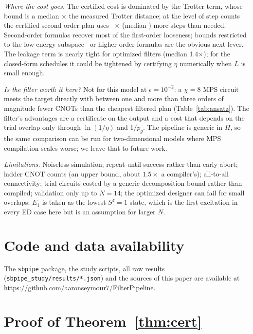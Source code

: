 \documentclass[aps,pra,twocolumn,superscriptaddress,nofootinbib]{revtex4-2}
\begin{document}
\emph{Where the cost goes.} The certified cost is dominated by the Trotter term, whose bound is a
median \trotRatioMed$\times$ the measured Trotter distance; at the level of step counts the certified
second-order plan uses \oracleMin--\oracleMax$\times$ (median \oracleMed) more steps than needed. Second-order formulas recover most of the first-order looseness;
bounds restricted to the low-energy subspace~\cite{Sahinoglu2021} or higher-order formulas are the
obvious next lever. The leakage term is nearly tight for optimized filters (median 1.4$\times$); for the closed-form
schedules it could be tightened by certifying $\eta$ numerically when $L$ is small enough.

\emph{Is the filter worth it here?} Not for this model at $\epsilon=10^{-2}$: a $\chi=8$ MPS circuit
meets the target directly with between one and more than three orders of magnitude fewer CNOTs than
the cheapest filtered plan (Table~\ref{tab:ansatz}).
The filter's advantages are a certificate on the output and a cost that depends on the trial overlap
only through $\ln(1/\eta)$ and $1/p_g$. The pipeline is generic
in $H$, so the same comparison can be run for two-dimensional models where MPS compilation scales
worse; we leave that to future work.

\emph{Limitations.} Noiseless simulation; repeat-until-success rather than early abort; ladder CNOT
counts (an upper bound, about $1.5\times$ a compiler's); all-to-all connectivity; trial circuits costed
by a generic decomposition bound rather than compiled; validation only up to $N=14$; the optimized
designer can fail for small overlaps; $E_1$ is taken as the lowest $S^z=1$ state, which is the first
excitation in every ED case here but is an assumption for larger $N$.

\section*{Code and data availability}
The \texttt{sbpipe} package, the study scripts, all raw results (\texttt{sbpipe\_study/results/*.json}) and
the sources of this paper are available at \url{https://github.com/aaronseymour7/FilterPipeline}.

\appendix

\section{Proof of Theorem~\ref{thm:cert}}
\label{app:proof}
\end{document}
